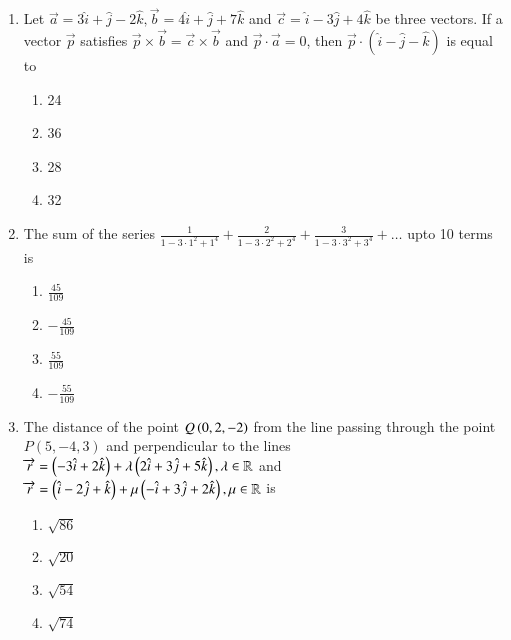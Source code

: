 \documentclass[journal]{IEEEtran}
\begin{document}
\begin{enumerate}
    \item Let $\overrightarrow{a} = 3\hat{i} + \hat{j} - 2\hat{k}, \overrightarrow{b} = 4\hat{i} + \hat{j} + 7\hat{k}$
    and $\overrightarrow{c} = \hat{i} - 3\hat{j} + 4\hat{k}$ be three vectors. If a
    vector $\overrightarrow{p}$ satisfies $\overrightarrow{p} \times \overrightarrow{b} = \overrightarrow{c} \times \overrightarrow{b}$
    and $\overrightarrow{p} \cdot \overrightarrow{a} = 0$, then $\overrightarrow{p} \cdot (\hat{i} - \hat{j} - \hat{k})$
    is equal to

    \begin{multicols}{4}
\begin{enumerate}

        \item 24
        \item 36
        \item 28
        \item 32
    \end{enumerate}
\end{multicols}

    \item The sum of the series $\frac{1}{1-3\cdot 1^2+1^4}+\frac{2}{1-3\cdot 2^2+2^4}
    +\frac{3}{1-3\cdot 3^2+3^4} + \dots$ upto 10 terms is

    \begin{multicols}{4}
\begin{enumerate}

        \item $\frac{45}{109}$
        \item $-\frac{45}{109}$
        \item $\frac{55}{109}$
        \item $-\frac{55}{109}$
    \end{enumerate}
\end{multicols}

    \item The distance of the point $Q\left(0, 2, -2\right)$ from the line passing
    through the point $P(5, -4, 3)$ and perpendicular to the lines 
    $\overrightarrow{r} = \left(-3\hat{i} + 2\hat{k}\right) + \lambda\left(2\hat{i} + 3\hat{j} + 5\hat{k}\right), \lambda \in \mathbb{R}$
    and $\overrightarrow{r} = \left(\hat{i} - 2\hat{j} + \hat{k}\right) + \mu\left(-\hat{i} + 3\hat{j} + 2\hat{k}\right), \mu \in \mathbb{R}$
    is

    \begin{multicols}{4}
\begin{enumerate}

        \item $\sqrt{86}$
        \item $\sqrt{20}$
        \item $\sqrt{54}$
        \item $\sqrt{74}$
    \end{enumerate}
\end{multicols}


\end{enumerate}
\end{document}
